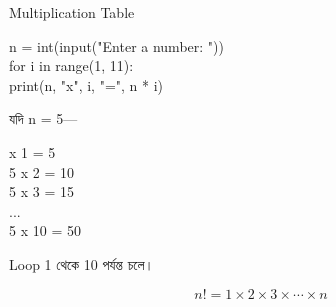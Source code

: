 \begin{codeoutputbox}{Multiplication Table}

\noindent
\begin{minipage}[t]{0.55\linewidth}
\codeheading

\begin{english}
\ttfamily
n = int(input("Enter a number: "))\\[0.5mm]
for i in range(1, 11):\\
\hspace*{4mm}print(n, "x", i, "=", n * i)
\end{english}

\end{minipage}
\hfill
\begin{minipage}[t]{0.41\linewidth}
\outputheading

যদি
\textenglish{\ttfamily n = 5}—

\begin{english}
 x 1 = 5\\
5 x 2 = 10\\
5 x 3 = 15\\
...\\
5 x 10 = 50
\end{english}

Loop 1 থেকে 10 পর্যন্ত চলে।

\end{minipage}

\end{codeoutputbox}



\[
n! = 1 \times 2 \times 3 \times \cdots \times n
\]

